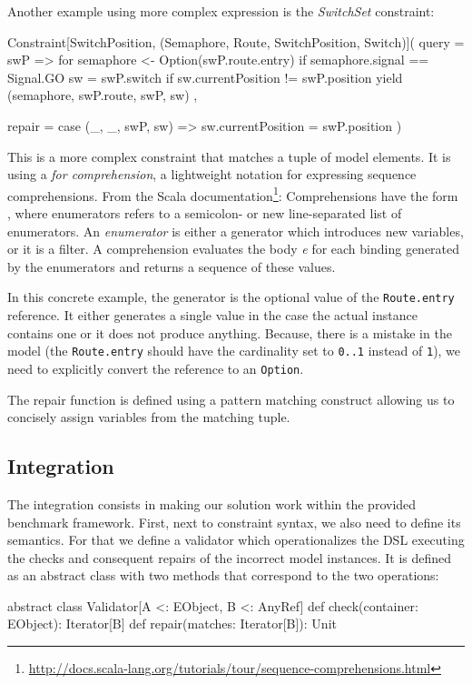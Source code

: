 Another example using more complex expression is the \emph{SwitchSet} constraint:
%
\begin{scalacode}
Constraint[SwitchPosition, (Semaphore, Route, SwitchPosition, Switch)](
  query = swP => {
    for {
      semaphore <- Option(swP.route.entry) if semaphore.signal == Signal.GO
      sw = swP.switch if sw.currentPosition != swP.position
    } yield (semaphore, swP.route, swP, sw)
  },

  repair = {
    case (_, _, swP, sw) => sw.currentPosition = swP.position
  }
)
\end{scalacode}
%
This is a more complex constraint that matches a tuple of model elements.
It is using a \emph{for comprehension}, a lightweight notation for expressing sequence comprehensions.
From the Scala documentation\footnote{\url{http://docs.scala-lang.org/tutorials/tour/sequence-comprehensions.html}}:
Comprehensions have the form , where enumerators refers to a semicolon- or new line-separated list of enumerators.
An \emph{enumerator} is either a generator which introduces new variables, or it is a filter.
A comprehension evaluates the body \emph{e} for each binding generated by the enumerators and returns a sequence of these values.

In this concrete example, the generator is the optional value of the \texttt{Route.entry} reference.
It either generates a single value in the case the actual instance contains one or it does not produce anything.
Because, there is a mistake in the model (the \texttt{Route.entry} should have the cardinality set to \texttt{0..1} instead of \texttt{1}), we need to explicitly convert the reference to an \texttt{Option}.

The repair function is defined using a pattern matching construct allowing us to concisely assign variables from the matching tuple.

\subsection{Integration}

The integration consists in making our solution work within the provided benchmark framework.
First, next to constraint syntax, we also need to define its semantics.
For that we define a validator which operationalizes the DSL executing the checks and consequent repairs of the incorrect model instances.
It is defined as an abstract class with two methods that correspond to the two operations:
%
\begin{scalacode}
abstract class Validator[A <: EObject, B <: AnyRef] {
  def check(container: EObject): Iterator[B]
  def repair(matches: Iterator[B]): Unit
}
\end{scalacode}
%

